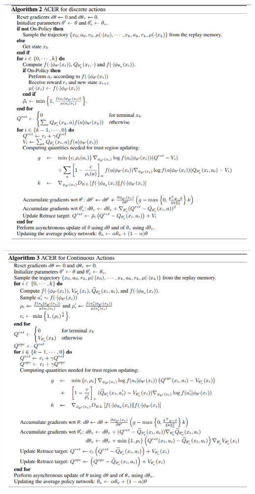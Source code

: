 \documentclass{beamer}
\begin{document}
\begin{frame}
\begin{center}
\includegraphics[scale=0.25]{acer_discrete}
\end{center}
\end{frame}

\begin{frame}
\begin{center}
\includegraphics[scale=0.25]{acer_cont}
\end{center}
\end{frame}
\end{document}
